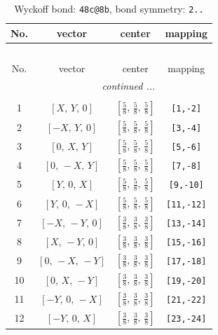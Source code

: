\documentclass[fleqn,8pt]{jsarticle}
\begin{document}
\begin{longtable}{cccc}
\caption{Wyckoff bond: {\tt 48c@8b}, bond symmetry: {\tt 2..}}
 \\
 \hline \hline
No. & vector & center & mapping \\ \hline \endfirsthead

\multicolumn{3}{l}{\tablename\ \thetable{}} \\
 \hline \hline
No. & vector & center & mapping \\ \hline \endhead

 \hline \hline
\multicolumn{3}{r}{\footnotesize\it continued ...} \\ \endfoot

 \hline \hline
\multicolumn{3}{r}{} \\ \endlastfoot

1 & $\left[ X,\, Y,\, 0 \right]$ & $\left[ \frac{5}{8},\, \frac{5}{8},\, \frac{5}{8} \right]$ & {\tt [1,-2]} \\ \hline
2 & $\left[ - X,\, Y,\, 0 \right]$ & $\left[ \frac{5}{8},\, \frac{5}{8},\, \frac{5}{8} \right]$ & {\tt [3,-4]} \\ \hline
3 & $\left[ 0,\, X,\, Y \right]$ & $\left[ \frac{5}{8},\, \frac{5}{8},\, \frac{5}{8} \right]$ & {\tt [5,-6]} \\ \hline
4 & $\left[ 0,\, - X,\, Y \right]$ & $\left[ \frac{5}{8},\, \frac{5}{8},\, \frac{5}{8} \right]$ & {\tt [7,-8]} \\ \hline
5 & $\left[ Y,\, 0,\, X \right]$ & $\left[ \frac{5}{8},\, \frac{5}{8},\, \frac{5}{8} \right]$ & {\tt [9,-10]} \\ \hline
6 & $\left[ Y,\, 0,\, - X \right]$ & $\left[ \frac{5}{8},\, \frac{5}{8},\, \frac{5}{8} \right]$ & {\tt [11,-12]} \\ \hline
7 & $\left[ - X,\, - Y,\, 0 \right]$ & $\left[ \frac{3}{8},\, \frac{3}{8},\, \frac{3}{8} \right]$ & {\tt [13,-14]} \\ \hline
8 & $\left[ X,\, - Y,\, 0 \right]$ & $\left[ \frac{3}{8},\, \frac{3}{8},\, \frac{3}{8} \right]$ & {\tt [15,-16]} \\ \hline
9 & $\left[ 0,\, - X,\, - Y \right]$ & $\left[ \frac{3}{8},\, \frac{3}{8},\, \frac{3}{8} \right]$ & {\tt [17,-18]} \\ \hline
10 & $\left[ 0,\, X,\, - Y \right]$ & $\left[ \frac{3}{8},\, \frac{3}{8},\, \frac{3}{8} \right]$ & {\tt [19,-20]} \\ \hline
11 & $\left[ - Y,\, 0,\, - X \right]$ & $\left[ \frac{3}{8},\, \frac{3}{8},\, \frac{3}{8} \right]$ & {\tt [21,-22]} \\ \hline
12 & $\left[ - Y,\, 0,\, X \right]$ & $\left[ \frac{3}{8},\, \frac{3}{8},\, \frac{3}{8} \right]$ & {\tt [23,-24]} \\
\end{longtable}
\end{document}
